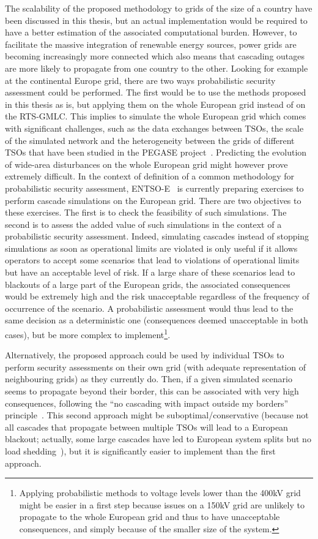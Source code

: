 The scalability of the proposed methodology to grids of the size of a country have been discussed in this thesis, but an actual implementation would be required to have a better estimation of the associated computational burden. However, to facilitate the massive integration of renewable energy sources, power grids are becoming increasingly more connected which also means that cascading outages are more likely to propagate from one country to the other. Looking for example at the continental Europe grid, there are two ways probabilistic security assessment could be performed. The first would be to use the methods proposed in this thesis as is, but applying them on the whole European grid instead of on the RTS-GMLC. This implies to simulate the whole European grid which comes with significant challenges, such as the data exchanges between TSOs, the scale of the simulated network and the heterogeneity between the grids of different TSOs that have been studied in the PEGASE project~\cite{PEGASE_project}. Predicting the evolution of wide-area disturbances on the whole European grid might however prove extremely difficult. In the context of definition of a common methodology for probabilistic security assessment, ENTSO-E~\cite{ENTSOE-PSA_second_report} is currently preparing exercises to perform cascade simulations on the European grid. There are two objectives to these exercises. The first is to check the feasibility of such simulations. The second is to assess the added value of such simulations in the context of a probabilistic security assessment. Indeed, simulating cascades instead of stopping simulations as soon as operational limits are violated is only useful if it allows operators to accept some scenarios that lead to violations of operational limits but have an acceptable level of risk. If a large share of these scenarios lead to blackouts of a large part of the European grids, the associated consequences would be extremely high and the risk unacceptable regardless of the frequency of occurrence of the scenario. A probabilistic assessment would thus lead to the same decision as a deterministic one (consequences deemed unacceptable in both cases), but be more complex to implement\footnote{Applying probabilistic methods to voltage levels lower than the 400kV grid might be easier in a first step because issues on a 150kV grid are unlikely to propagate to the whole European grid and thus to have unacceptable consequences, and simply because of the smaller size of the system.}.

Alternatively, the proposed approach could be used by individual TSOs to perform security assessments on their own grid (with adequate representation of neighbouring grids) as they currently do. Then, if a given simulated scenario seems to propagate beyond their border, this can be associated with very high consequences, following the ``no cascading with impact outside my borders'' principle~\cite{N-1-ENTSOE}. This second approach might be suboptimal/conservative (because not all cascades that propagate between multiple TSOs will lead to a European blackout; actually, some large cascades have led to European system splits but no load shedding~\cite{ENTSOESplitJan2021}), but it is significantly easier to implement than the first approach.

